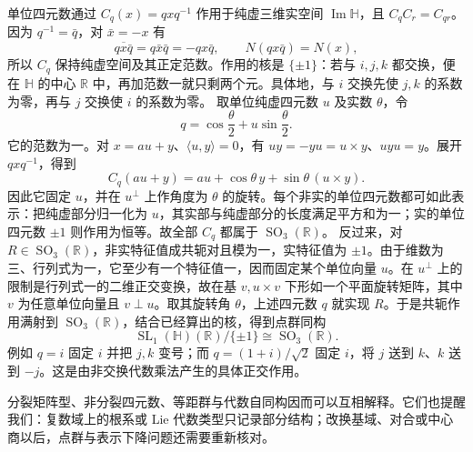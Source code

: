 \begin{example}\label{b5:exm:quaternion-conjugation-group}
	单位四元数通过 \(C_q(x)=qxq^{-1}\) 作用于纯虚三维实空间 \(\operatorname{Im}\mathbb H\)，且 \(C_qC_r=C_{qr}\)。因为 \(q^{-1}=\bar q\)，对 \(\bar x=-x\) 有
	\[
		\overline{qx\bar q}=q\bar x\bar q=-qx\bar q, \qquad N(qx\bar q)=N(x),
	\]
	所以 \(C_q\) 保持纯虚空间及其正定范数。作用的核是 \(\{\pm1\}\)：若与 \(i,j,k\) 都交换，便在 \(\mathbb H\) 的中心 \(\mathbb R\) 中，再加范数一就只剩两个元。具体地，与 \(i\) 交换先使 \(j,k\) 的系数为零，再与 \(j\) 交换使 \(i\) 的系数为零。
	\ProseParagraphBreak
	取单位纯虚四元数 \(u\) 及实数 \(\theta\)，令
	\[
		q=\cos\frac\theta2+u\sin\frac\theta2.
	\]
	它的范数为一。对 \(x=au+y\)、\(\langle u,y\rangle=0\)，有 \(uy=-yu=u\times y\)、\(uyu=y\)。展开 \(qxq^{-1}\)，得到
	\[
		C_q(au+y)=au+\cos\theta\,y+\sin\theta\,(u\times y).
	\]
	因此它固定 \(u\)，并在 \(u^\perp\) 上作角度为 \(\theta\) 的旋转。每个非实的单位四元数都可如此表示：把纯虚部分归一化为 \(u\)，其实部与纯虚部分的长度满足平方和为一；实的单位四元数 \(\pm1\) 则作用为恒等。故全部 \(C_q\) 都属于 \(\operatorname{SO}_3(\mathbb R)\)。
	\ProseParagraphBreak
	反过来，对 \(R\in\operatorname{SO}_3(\mathbb R)\)，非实特征值成共轭对且模为一，实特征值为 \(\pm1\)。由于维数为三、行列式为一，它至少有一个特征值一，因而固定某个单位向量 \(u\)。在 \(u^\perp\) 上的限制是行列式一的二维正交变换，故在基 \(v,u\times v\) 下形如一个平面旋转矩阵，其中 \(v\) 为任意单位向量且 \(v\perp u\)。取其旋转角 \(\theta\)，上述四元数 \(q\) 就实现 \(R\)。于是共轭作用满射到 \(\operatorname{SO}_3(\mathbb R)\)，结合已经算出的核，得到点群同构
	\[
		\operatorname{SL}_1(\mathbb H)(\mathbb R)/\{\pm1\} \cong\operatorname{SO}_3(\mathbb R).
	\]
	例如 \(q=i\) 固定 \(i\) 并把 \(j,k\) 变号；而 \(q=(1+i)/\sqrt2\) 固定 \(i\)，将 \(j\) 送到 \(k\)、\(k\) 送到 \(-j\)。这是由非交换代数乘法产生的具体正交作用。
\end{example}
分裂矩阵型、非分裂四元数、等距群与代数自同构因而可以互相解释。它们也提醒我们：复数域上的根系或 Lie 代数类型只记录部分结构；改换基域、对合或中心商以后，点群与表示下降问题还需要重新核对。
